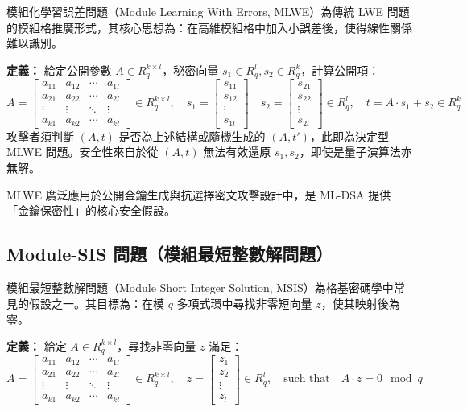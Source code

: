 \documentclass[12pt, a4paper, fleqn]{./styles/ntust_report}
\begin{document}
模組化學習誤差問題（Module Learning With Errors, MLWE）為傳統 LWE 問題的模組格推廣形式，其核心思想為：在高維模組格中加入小誤差後，使得線性關係難以識別。

\textbf{定義：} 給定公開參數 $A \in R_q^{k \times l}$，秘密向量 $s_1 \in R_q^l, s_2 \in R_q^k$，計算公開項：
\[
A =
\begin{bmatrix}
a_{11} & a_{12} & \cdots & a_{1l} \\
a_{21} & a_{22} & \cdots & a_{2l} \\
\vdots & \vdots & \ddots & \vdots \\
a_{k1} & a_{k2} & \cdots & a_{kl}
\end{bmatrix}
\in R_q^{k \times l}, \quad
s_1 =
\begin{bmatrix}
s_{11} \\
s_{12} \\
\vdots \\
s_{1l}
\end{bmatrix}\quad
s_2 =
\begin{bmatrix}
s_{21} \\
s_{22} \\
\vdots \\
s_{2l}
\end{bmatrix}
\in R_q^l,
\quad
t = A \cdot s_1 + s_2 \in R_q^k
\]
攻擊者須判斷 $(A, t)$ 是否為上述結構或隨機生成的 $(A, t')$，此即為決定型 MLWE 問題。安全性來自於從 $(A, t)$ 無法有效還原 $s_1, s_2$，即使是量子演算法亦無解。

MLWE 廣泛應用於公開金鑰生成與抗選擇密文攻擊設計中，是 ML-DSA 提供「金鑰保密性」的核心安全假設。


\subsection{Module-SIS 問題（模組最短整數解問題）}
模組最短整數解問題（Module Short Integer Solution, MSIS）為格基密碼學中常見的假設之一。其目標為：在模 $q$ 多項式環中尋找非零短向量 $z$，使其映射後為零。

\textbf{定義：} 給定 $A \in R_q^{k \times l}$，尋找非零向量 $z$ 滿足：
\[
A =
\begin{bmatrix}
a_{11} & a_{12} & \cdots & a_{1l} \\
a_{21} & a_{22} & \cdots & a_{2l} \\
\vdots & \vdots & \ddots & \vdots \\
a_{k1} & a_{k2} & \cdots & a_{kl}
\end{bmatrix}
\in R_q^{k \times l}, \quad
z =
\begin{bmatrix}
z_1 \\
z_2 \\
\vdots \\
z_l
\end{bmatrix}
\in R_q^l, \quad
\text{such that} \quad
A \cdot z = 0 \mod q
\]
\end{document}
